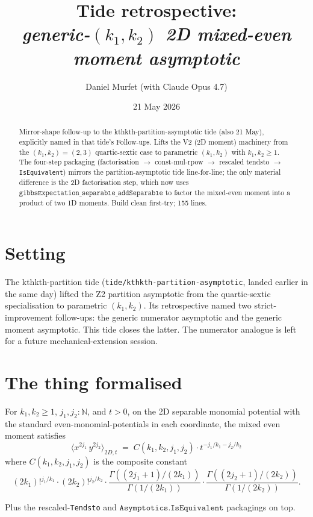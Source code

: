 \documentclass[11pt]{article}
\title{Tide retrospective: \\\emph{generic-$(k_1, k_2)$ 2D mixed-even moment asymptotic}}
\author{Daniel Murfet (with Claude Opus 4.7)}
\date{21 May 2026}
\begin{document}
\maketitle

\begin{abstract}
Mirror-shape follow-up to the kthkth-partition-asymptotic tide (also
21 May), explicitly named in that tide's Follow-ups. Lifts the V2
(2D moment) machinery from the
$(k_1, k_2) = (2, 3)$ quartic-sextic case to parametric $(k_1, k_2)$
with $k_1, k_2 \ge 1$. The four-step packaging
(factorisation $\to$ const-mul-rpow $\to$ rescaled tendsto $\to$
\texttt{IsEquivalent}) mirrors the partition-asymptotic tide
line-for-line; the only material difference is the 2D
factorisation step, which now uses
$\texttt{gibbsExpectation\_separable\_addSeparable}$ to factor the
mixed-even moment into a product of two 1D moments. Build clean
first-try; 155 lines.
\end{abstract}

\section{Setting}

The kthkth-partition tide (\texttt{tide/kthkth-partition-asymptotic},
landed earlier in the same day) lifted the Z2 partition asymptotic
from the quartic-sextic specialisation to parametric $(k_1, k_2)$.
Its retrospective named two strict-improvement follow-ups: the
generic numerator asymptotic and the generic moment asymptotic. This
tide closes the latter. The numerator analogue is left for a future
mechanical-extension session.

\section{The thing formalised}

For $k_1, k_2 \ge 1$, $j_1, j_2 : \mathbb{N}$, and $t > 0$, on the
2D separable monomial potential with the standard
even-monomial-potentials in each coordinate,
the mixed even moment satisfies
\[
  \bigl\langle x^{2j_1}\, y^{2j_2}\bigr\rangle_{2D, t}
    \;=\; C(k_1, k_2, j_1, j_2) \cdot t^{-j_1/k_1 - j_2/k_2}
\]
where $C(k_1, k_2, j_1, j_2)$ is the composite constant
\[
  (2k_1)!^{j_1/k_1} \cdot (2k_2)!^{j_2/k_2}
    \cdot \frac{\Gamma((2j_1+1)/(2k_1))}{\Gamma(1/(2k_1))}
    \cdot \frac{\Gamma((2j_2+1)/(2k_2))}{\Gamma(1/(2k_2))}.
\]

Plus the rescaled-\texttt{Tendsto} and
$\texttt{Asymptotics.IsEquivalent}$ packagings on top.
\end{document}

